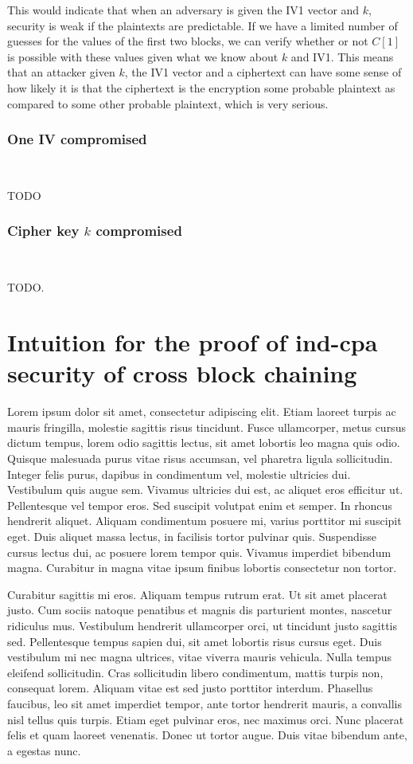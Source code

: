 \documentclass[conference]{IEEEtran}
\begin{document}
This would indicate that when an adversary is given the IV1 vector and $k$, security is weak if the plaintexts are predictable. If we have a limited number of guesses for the values of the first two blocks, we can verify whether or not $C[1]$ is possible with these values given what we know about $k$ and IV1. This means that an attacker given $k$, the IV1 vector and a ciphertext can have some sense of how likely it is that the ciphertext is the encryption some probable plaintext as compared to some other probable plaintext, which is very serious.

\subsubsection{One IV compromised} \

TODO

\subsubsection{Cipher key $k$ compromised} \

TODO.

\section{Intuition for the proof of ind-cpa security of cross block chaining}

Lorem ipsum dolor sit amet, consectetur adipiscing elit. Etiam laoreet turpis ac mauris fringilla, molestie sagittis risus tincidunt. Fusce ullamcorper, metus cursus dictum tempus, lorem odio sagittis lectus, sit amet lobortis leo magna quis odio. Quisque malesuada purus vitae risus accumsan, vel pharetra ligula sollicitudin. Integer felis purus, dapibus in condimentum vel, molestie ultricies dui. Vestibulum quis augue sem. Vivamus ultricies dui est, ac aliquet eros efficitur ut. Pellentesque vel tempor eros. Sed suscipit volutpat enim et semper. In rhoncus hendrerit aliquet. Aliquam condimentum posuere mi, varius porttitor mi suscipit eget. Duis aliquet massa lectus, in facilisis tortor pulvinar quis. Suspendisse cursus lectus dui, ac posuere lorem tempor quis. Vivamus imperdiet bibendum magna. Curabitur in magna vitae ipsum finibus lobortis consectetur non tortor.

Curabitur sagittis mi eros. Aliquam tempus rutrum erat. Ut sit amet placerat justo. Cum sociis natoque penatibus et magnis dis parturient montes, nascetur ridiculus mus. Vestibulum hendrerit ullamcorper orci, ut tincidunt justo sagittis sed. Pellentesque tempus sapien dui, sit amet lobortis risus cursus eget. Duis vestibulum mi nec magna ultrices, vitae viverra mauris vehicula. Nulla tempus eleifend sollicitudin. Cras sollicitudin libero condimentum, mattis turpis non, consequat lorem. Aliquam vitae est sed justo porttitor interdum. Phasellus faucibus, leo sit amet imperdiet tempor, ante tortor hendrerit mauris, a convallis nisl tellus quis turpis. Etiam eget pulvinar eros, nec maximus orci. Nunc placerat felis et quam laoreet venenatis. Donec ut tortor augue. Duis vitae bibendum ante, a egestas nunc.
\end{document}
